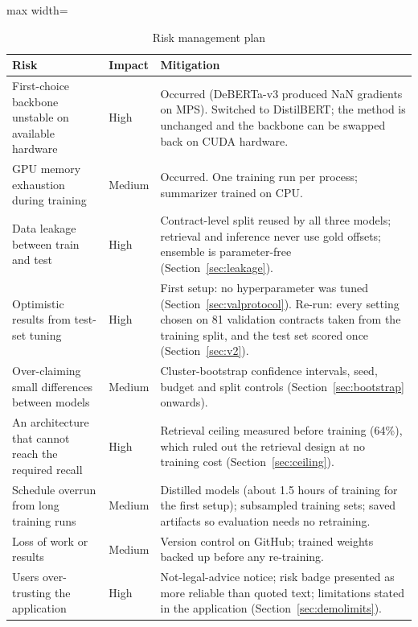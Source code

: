 \begin{table}[!htbp]
\centering
\caption{Risk management plan}
\label{tab:projrisk}
\small
\begin{adjustbox}{max width=\textwidth}
\begin{tabular}{>{\raggedright\arraybackslash}p{4.1cm} >{\raggedright\arraybackslash}p{1.5cm} >{\raggedright\arraybackslash}p{7.6cm}}
\toprule
\textbf{Risk} & \textbf{Impact} & \textbf{Mitigation}\\
\midrule
First-choice backbone unstable on available hardware & High & Occurred (DeBERTa-v3 produced NaN gradients on MPS). Switched to DistilBERT; the method is unchanged and the backbone can be swapped back on CUDA hardware.\\
\addlinespace
GPU memory exhaustion during training & Medium & Occurred. One training run per process; summarizer trained on CPU.\\
\addlinespace
Data leakage between train and test & High & Contract-level split reused by all three models; retrieval and inference never use gold offsets; ensemble is parameter-free (Section~\ref{sec:leakage}).\\
\addlinespace
Optimistic results from test-set tuning & High & First setup: no hyperparameter was tuned (Section~\ref{sec:valprotocol}). Re-run: every setting chosen on 81 validation contracts taken from the training split, and the test set scored once (Section~\ref{sec:v2}).\\
\addlinespace
Over-claiming small differences between models & Medium & Cluster-bootstrap confidence intervals, seed, budget and split controls (Section~\ref{sec:bootstrap} onwards).\\
\addlinespace
An architecture that cannot reach the required recall & High & Retrieval ceiling measured before training (64\%), which ruled out the retrieval design at no training cost (Section~\ref{sec:ceiling}).\\
\addlinespace
Schedule overrun from long training runs & Medium & Distilled models (about 1.5 hours of training for the first setup); subsampled training sets; saved artifacts so evaluation needs no retraining.\\
\addlinespace
Loss of work or results & Medium & Version control on GitHub; trained weights backed up before any re-training.\\
\addlinespace
Users over-trusting the application & High & Not-legal-advice notice; risk badge presented as more reliable than quoted text; limitations stated in the application (Section~\ref{sec:demolimits}).\\
\bottomrule
\end{tabular}
\end{adjustbox}
\end{table}

